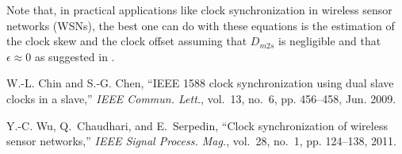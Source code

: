 \documentclass[journal,twoside,final]{IEEEtran}
\begin{document}
Note that, in practical applications like clock synchronization in wireless
sensor networks (WSNs), the best one can do with these equations is the
estimation of the clock skew and the clock offset assuming that $D_{m2s}$ is
negligible and that $\epsilon \approx 0$ as suggested in
\cite{wu11:_clock_synch_wirel_sensor_networ}.

\begin{thebibliography}{10}

 W.-L. Chin and S.-G. Chen, ``{IEEE} 1588 clock
  synchronization using dual slave clocks in a slave,'' \emph{{IEEE}
    Commun. Lett.}, vol.~13, no.~6, pp.  456--458, Jun. 2009.

 Y.-C. Wu, Q.~Chaudhari, and
  E.~Serpedin, ``Clock synchronization of wireless sensor networks,''
  \emph{{IEEE} Signal Process. Mag.}, vol.~28, no.~1, pp.  124--138, 2011.

\end{thebibliography}
\end{document}
